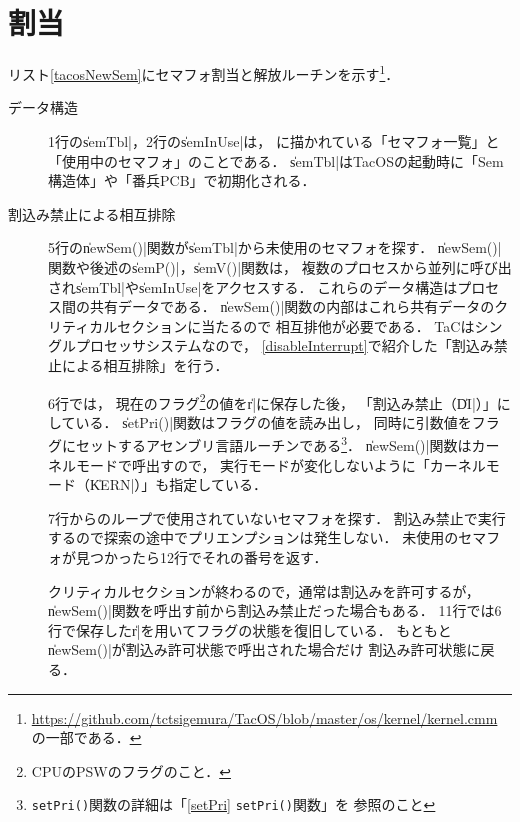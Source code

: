 \section{割当}
リスト\ref{tacosNewSem}にセマフォ割当と解放ルーチンを示す\footnote{
  \url{https://github.com/tctsigemura/TacOS/blob/master/os/kernel/kernel.cmm}
  の一部である．}．



\begin{description}
\item [データ構造]
  1行の\|semTbl|，2行の\|semInUse|は，
   に描かれている「セマフォ一覧」と
 「使用中のセマフォ」のことである．
 \|semTbl|はTacOSの起動時に「Sem構造体」や「番兵PCB」で初期化される．

\item [割込み禁止による相互排除]
  5行の\|newSem()|関数が\|semTbl|から未使用のセマフォを探す．
  \|newSem()|関数や後述の\|semP()|，\|semV()|関数は，
  複数のプロセスから並列に呼び出され\|semTbl|や\|semInUse|をアクセスする．
  これらのデータ構造はプロセス間の共有データである．
  \|newSem()|関数の内部はこれら共有データのクリティカルセクションに当たるので
  相互排他が必要である．
  TaCはシングルプロセッサシステムなので，
  \ref{disableInterrupt}で紹介した「割込み禁止による相互排除」を行う．

  6行では，
  現在のフラグ\footnote{CPUのPSWのフラグのこと．}の値を\|r|に保存した後，
  「割込み禁止（\|DI|）」にしている．
  \|setPri()|関数はフラグの値を読み出し，
  同時に引数値をフラグにセットするアセンブリ言語ルーチンである\footnote{
    \texttt{setPri()}関数の詳細は「\ref{setPri} \texttt{setPri()}関数」を
    参照のこと}．
  \|newSem()|関数はカーネルモードで呼出すので，
  実行モードが変化しないように「カーネルモード（\|KERN|）」も指定している．

  7行からのループで使用されていないセマフォを探す．
  割込み禁止で実行するので探索の途中でプリエンプションは発生しない．
  未使用のセマフォが見つかったら12行でそれの番号を返す．

  クリティカルセクションが終わるので，通常は割込みを許可するが，
  \|newSem()|関数を呼出す前から割込み禁止だった場合もある．
  11行では6行で保存した\|r|を用いてフラグの状態を復旧している．
  もともと\|newSem()|が割込み許可状態で呼出された場合だけ
  割込み許可状態に戻る．


\end{description}
